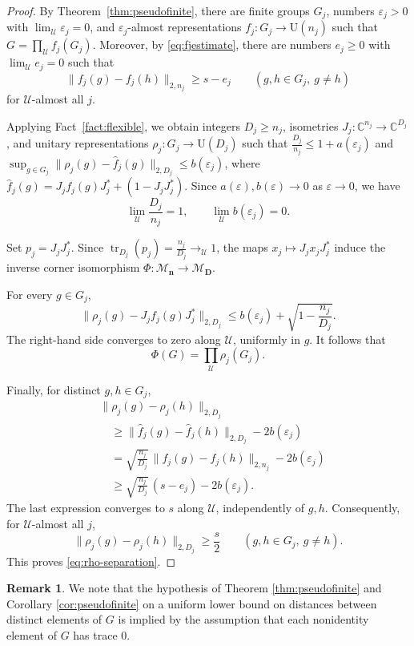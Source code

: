 \documentclass[12pt]{amsart}
\numberwithin{equation}{section}
\theoremstyle{definition}
\newtheorem{remark}[thm]{Remark}
\def\M{\mathcal{M}}
\def \M{\mathcal{M}}
\begin{document}
\begin{proof}
By Theorem~\ref{thm:pseudofinite}, there are finite
groups $G_j$, numbers $\varepsilon_j>0$ with
$\lim_{\mathcal U}\varepsilon_j=0$, and
$\varepsilon_j$-almost representations $f_j:G_j\to\mathrm U(n_j)$ 
such that $G=\prod_{\mathcal U}f_j(G_j)$. 
Moreover, by \eqref{eq:fjestimate}, there are
numbers $e_j\ge0$ with
$\lim_{\mathcal U}e_j=0$ such that
\[
\|f_j(g)-f_j(h)\|_{2,n_j}\ge s-e_j
\qquad(g,h\in G_j,\ g\ne h)
\]
for $\mathcal U$-almost all $j$.

Applying Fact~\ref{fact:flexible}, we obtain
integers $D_j\ge n_j$, isometries
$J_j:\mathbb C^{n_j}\to\mathbb C^{D_j}$,
and unitary representations
$\rho_j:G_j\to\mathrm U(D_j)$ such that 
$\frac{D_j}{n_j}\le1+a(\varepsilon_j)$ 
and $\sup_{g\in G_j}
\|\rho_j(g)-\widehat f_j(g)\|_{2,D_j}
\le b(\varepsilon_j)$, 
where $\widehat f_j(g)
=J_jf_j(g)J_j^*+(1-J_jJ_j^*)$. 
Since $a(\varepsilon),b(\varepsilon)\to0$
as $\varepsilon\to0$, we have
\[
\lim_{\mathcal U}\frac{D_j}{n_j}=1,
\qquad
\lim_{\mathcal U}b(\varepsilon_j)=0.
\]

Set $p_j=J_jJ_j^*$. Since
$\operatorname{tr}_{D_j}(p_j)
=\frac{n_j}{D_j}\longrightarrow_{\mathcal U}1$, the maps $x_j\mapsto J_jx_jJ_j^*$ induce
the inverse corner isomorphism
$\Phi:\M_{\mathbf n}\to\M_{\mathbf D}$. 

For every $g\in G_j$,
\[
\|\rho_j(g)-J_jf_j(g)J_j^*\|_{2,D_j}
\le b(\varepsilon_j)
+\sqrt{1-\frac{n_j}{D_j}}.
\]
The right-hand side converges to zero along
$\mathcal U$, uniformly in $g$.
It follows that
\[
\Phi(G)=\prod_{\mathcal U}\rho_j(G_j).
\]

Finally, for distinct $g,h\in G_j$,
\[
\begin{aligned}
&\|\rho_j(g)-\rho_j(h)\|_{2,D_j}\\
&\quad\ge
\|\widehat f_j(g)-\widehat f_j(h)\|_{2,D_j}
-2b(\varepsilon_j)\\
&\quad=
\sqrt{\frac{n_j}{D_j}}\,
\|f_j(g)-f_j(h)\|_{2,n_j}
-2b(\varepsilon_j)\\
&\quad\ge
\sqrt{\frac{n_j}{D_j}}\,(s-e_j)
-2b(\varepsilon_j).
\end{aligned}
\]
The last expression converges to $s$
along $\mathcal U$, independently of
$g,h$. Consequently, for
$\mathcal U$-almost all $j$,
\[
\|\rho_j(g)-\rho_j(h)\|_{2,D_j}
\ge\frac{s}{2}
\qquad(g,h\in G_j,\ g\ne h).
\]
This proves \eqref{eq:rho-separation}.
\end{proof}

\begin{remark}\label{rem:tracezero}
We note that the hypothesis of Theorem \ref{thm:pseudofinite} and Corollary \ref{cor:pseudofinite} on a uniform lower bound on distances between distinct elements of $G$ is implied by the assumption that each nonidentity element of $G$ has trace $0$.  
\end{remark}
\end{document}
